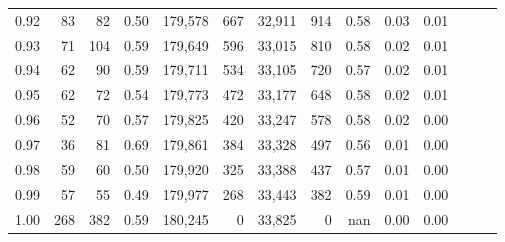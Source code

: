 \begin{tabular}{rrrrrrrrrrrrrr}
0.92 &     83 &   82 &  0.50 &  179,578 &      667 &  32,911 &     914 &  0.58 &  0.03 &      0.01 \\
0.93 &     71 &  104 &  0.59 &  179,649 &      596 &  33,015 &     810 &  0.58 &  0.02 &      0.01 \\
0.94 &     62 &   90 &  0.59 &  179,711 &      534 &  33,105 &     720 &  0.57 &  0.02 &      0.01 \\
0.95 &     62 &   72 &  0.54 &  179,773 &      472 &  33,177 &     648 &  0.58 &  0.02 &      0.01 \\
0.96 &     52 &   70 &  0.57 &  179,825 &      420 &  33,247 &     578 &  0.58 &  0.02 &      0.00 \\
0.97 &     36 &   81 &  0.69 &  179,861 &      384 &  33,328 &     497 &  0.56 &  0.01 &      0.00 \\
0.98 &     59 &   60 &  0.50 &  179,920 &      325 &  33,388 &     437 &  0.57 &  0.01 &      0.00 \\
0.99 &     57 &   55 &  0.49 &  179,977 &      268 &  33,443 &     382 &  0.59 &  0.01 &      0.00 \\
1.00 &    268 &  382 &  0.59 &  180,245 &        0 &  33,825 &       0 &   nan &  0.00 &      0.00 \\
\bottomrule
\end{tabular}
